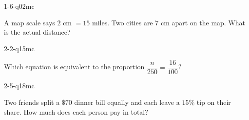\begin{practiceQuestion}{1-6-q02}{mc}
\begin{questionText}
A map scale says $2$ cm $= 15$ miles. Two cities are $7$ cm apart on the map. What is the actual distance?
\end{questionText}
\end{practiceQuestion}

\begin{practiceQuestion}{2-2-q15}{mc}
\begin{questionText}
Which equation is equivalent to the proportion $\dfrac{n}{250} = \dfrac{16}{100}$?
\end{questionText}
\end{practiceQuestion}

\begin{practiceQuestion}{2-5-q18}{mc}
\begin{questionText}
Two friends split a $\$70$ dinner bill equally and each leave a $15\%$ tip on their share. How much does each person pay in total?
\end{questionText}
\end{practiceQuestion}

